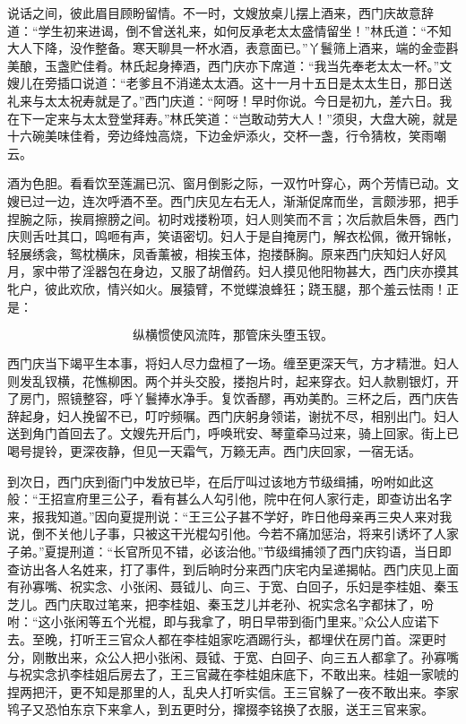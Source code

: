 说话之间，彼此眉目顾盼留情。不一时，文嫂放桌儿摆上酒来，西门庆故意辞道：“学生初来进谒，倒不曾送礼来，如何反承老太太盛情留坐！”林氏道：“不知大人下降，没作整备。寒天聊具一杯水酒，表意面已。”丫鬟筛上酒来，端的金壶斟美酿，玉盏贮佳肴。林氏起身捧酒，西门庆亦下席道：“我当先奉老太太一杯。”文嫂儿在旁插口说道：“老爹且不消递太太酒。这十一月十五日是太太生日，那日送礼来与太太祝寿就是了。”西门庆道：“阿呀！早时你说。今日是初九，差六日。我在下一定来与太太登堂拜寿。”林氏笑道：“岂敢动劳大人！”须臾，大盘大碗，就是十六碗美味佳肴，旁边绛烛高烧，下边金炉添火，交杯一盏，行令猜枚，笑雨嘲云。

酒为色胆。看看饮至莲漏已沉、窗月倒影之际，一双竹叶穿心，两个芳情已动。文嫂已过一边，连次呼酒不至。西门庆见左右无人，渐渐促席而坐，言颇涉邪，把手捏腕之际，挨肩擦膀之间。初时戏搂粉项，妇人则笑而不言；次后款启朱唇，西门庆则舌吐其口，鸣咂有声，笑语密切。妇人于是自掩房门，解衣松佩，微开锦帐，轻展绣衾，鸳枕横床，凤香薰被，相挨玉体，抱搂酥胸。原来西门庆知妇人好风月，家中带了淫器包在身边，又服了胡僧药。妇人摸见他阳物甚大，西门庆亦摸其牝户，彼此欢欣，情兴如火。展猿臂，不觉蝶浪蜂狂；跷玉腿，那个羞云怯雨！正是：

\[
纵横惯使风流阵，那管床头堕玉钗。
\]

西门庆当下竭平生本事，将妇人尽力盘桓了一场。缠至更深天气，方才精泄。妇人则发乱钗横，花憔柳困。两个并头交股，搂抱片时，起来穿衣。妇人款剔银灯，开了房门，照镜整容，呼丫鬟捧水净手。复饮香醪，再劝美酌。三杯之后，西门庆告辞起身，妇人挽留不已，叮咛频嘱。西门庆躬身领诺，谢扰不尽，相别出门。妇人送到角门首回去了。文嫂先开后门，呼唤玳安、琴童牵马过来，骑上回家。街上已喝号提铃，更深夜静，但见一天霜气，万籁无声。西门庆回家，一宿无话。

到次日，西门庆到衙门中发放已毕，在后厅叫过该地方节级缉捕，吩咐如此这般：“王招宣府里三公子，看有甚么人勾引他，院中在何人家行走，即查访出名字来，报我知道。”因向夏提刑说：“王三公子甚不学好，昨日他母亲再三央人来对我说，倒不关他儿子事，只被这干光棍勾引他。今若不痛加惩治，将来引诱坏了人家子弟。”夏提刑道：“长官所见不错，必该治他。”节级缉捕领了西门庆钧语，当日即查访出各人名姓来，打了事件，到后晌时分来西门庆宅内呈递揭帖。西门庆见上面有孙寡嘴、祝实念、小张闲、聂钺儿、向三、于宽、白回子，乐妇是李桂姐、秦玉芝儿。西门庆取过笔来，把李桂姐、秦玉芝儿并老孙、祝实念名字都抹了，吩咐：“这小张闲等五个光棍，即与我拿了，明日早带到衙门里来。”众公人应诺下去。至晚，打听王三官众人都在李桂姐家吃酒踢行头，都埋伏在房门首。深更时分，刚散出来，众公人把小张闲、聂钺、于宽、白回子、向三五人都拿了。孙寡嘴与祝实念扒李桂姐后房去了，王三官藏在李桂姐床底下，不敢出来。桂姐一家唬的捏两把汗，更不知是那里的人，乱央人打听实信。王三官躲了一夜不敢出来。李家鸨子又恐怕东京下来拿人，到五更时分，撺掇李铭换了衣服，送王三官来家。

